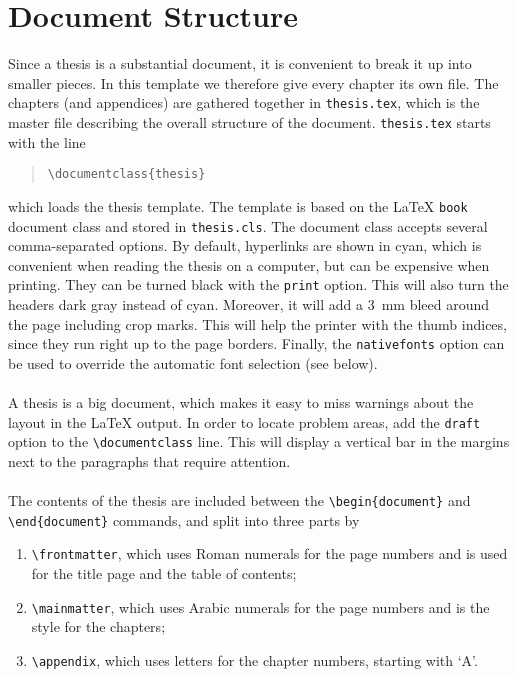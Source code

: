 \section{Document Structure}
Since a thesis is a substantial document, it is convenient to break it up into smaller pieces. In this template we therefore give every chapter its own file. The chapters (and appendices) are gathered together in \texttt{thesis.tex}, which is the master file describing the overall structure of the document. \texttt{thesis.tex} starts with the line
\begin{quote}
\texttt{\textbackslash documentclass\{thesis\}}
\end{quote}
which loads the thesis template. The template is based on the \LaTeX{} \texttt{book} document class and stored in \texttt{thesis.cls}. The document class accepts several comma-separated options. By default, hyperlinks are shown in cyan, which is convenient when reading the thesis on a computer, but can be expensive when printing. They can be turned black with the \texttt{print} option. This will also turn the headers dark gray instead of cyan. Moreover, it will add a 3~mm bleed around the page including crop marks. This will help the printer with the thumb indices, since they run right up to the page borders. Finally, the \texttt{nativefonts} option can be used to override the automatic font selection (see below).\\\\
A thesis is a big document, which makes it easy to miss warnings about the layout in the \LaTeX{} output. In order to locate problem areas, add the \texttt{draft} option to the \texttt{\textbackslash documentclass} line. This will display a vertical bar in the margins next to the paragraphs that require attention.\\\\
The contents of the thesis are included between the \texttt{\textbackslash begin\{document\}} and \texttt{\textbackslash end\{document\}} commands, and split into three parts by
\begin{enumerate}
\item\texttt{\textbackslash frontmatter}, which uses Roman numerals for the page numbers and is used for the title page and the table of contents;
\item\texttt{\textbackslash mainmatter}, which uses Arabic numerals for the page numbers and is the style for the chapters;
\item\texttt{\textbackslash appendix}, which uses letters for the chapter numbers, starting with `A'.
\end{enumerate}

